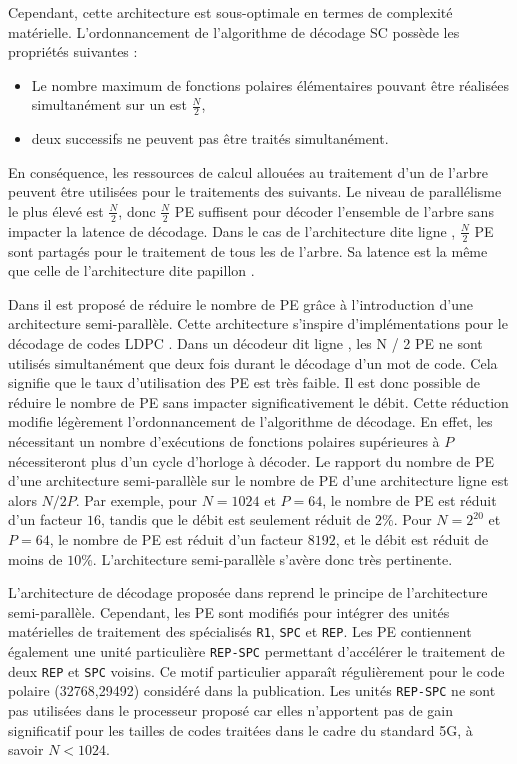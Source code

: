 Cependant, cette architecture est sous-optimale en termes de complexité matérielle.
L'ordonnancement de l'algorithme de décodage SC possède les propriétés suivantes :
\begin{itemize}
  \item Le nombre maximum de fonctions polaires élémentaires pouvant être réalisées simultanément sur un \noeud est $\frac{N}{2}$,
  \item deux \noeuds successifs ne peuvent pas être traités simultanément.
\end{itemize}
En conséquence, les ressources de calcul allouées au traitement d'un \noeud de l'arbre peuvent être utilisées pour le traitements des \noeuds suivants.
Le niveau de parallélisme le plus élevé est $\frac{N}{2}$, donc $\frac{N}{2}$ PE suffisent pour décoder l'ensemble de l'arbre sans impacter la latence de décodage.
Dans le cas de l'architecture dite \og ligne \fg, $\frac{N}{2}$ PE sont partagés pour le traitement de tous les \noeuds de l'arbre. Sa latence est la même que celle de l'architecture dite \og papillon \fg.

Dans \cite{leroux_semi-parallel_2013} il est proposé de réduire le nombre de PE grâce à l'introduction d'une architecture semi-parallèle. Cette architecture s'inspire d'implémentations pour le décodage de codes LDPC \cite{1049697}. Dans un décodeur dit \og ligne \fg, les N / 2 PE ne sont utilisés simultanément que deux fois durant le décodage d'un mot de code. Cela signifie que le taux d'utilisation des PE est très faible. Il est donc possible de réduire le nombre de PE sans impacter significativement le débit.
Cette réduction modifie légèrement l'ordonnancement de l'algorithme de décodage. En effet, les \noeuds nécessitant un nombre d'exécutions de fonctions polaires supérieures à $P$ nécessiteront plus d'un cycle d'horloge à décoder. Le rapport du nombre de PE d'une architecture semi-parallèle sur le nombre de PE d'une architecture \og ligne \fg est alors $N/2P$. Par exemple, pour $N=1024$ et $P=64$, le nombre de PE est réduit d'un facteur $16$, tandis que le débit est seulement réduit de $2\%$. Pour $N=2^{20}$ et $P=64$, le nombre de PE est réduit d'un facteur $8192$, et le débit est réduit de moins de $10\%$. L'architecture semi-parallèle s'avère donc très pertinente.

L'architecture de décodage proposée dans \cite{sarkis_fast_2014} reprend le principe de l'architecture semi-parallèle. Cependant, les PE sont modifiés pour intégrer des unités matérielles de traitement des \noeuds spécialisés \texttt{R1}, \texttt{SPC} et \texttt{REP}. Les PE contiennent également une unité particulière \texttt{REP-SPC} permettant d’accélérer le traitement de deux \noeuds \texttt{REP} et \texttt{SPC} voisins. Ce motif particulier apparaît régulièrement pour le code polaire (32768,29492) considéré dans la publication. Les unités \texttt{REP-SPC} ne sont pas utilisées dans le processeur proposé car elles n'apportent pas de gain significatif pour les tailles de codes traitées dans le cadre du standard 5G, à savoir $N<1024$.

